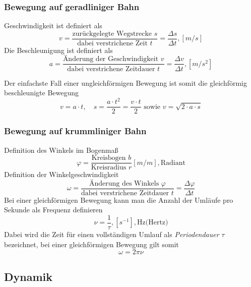 \documentclass[12pt,a4paper,ngerman]{article}
\begin{document}
\subsubsection*{Bewegung auf geradliniger Bahn}
Geschwindigkeit ist definiert als
\begin{equation}
v = \frac{\text{zurückgelegte Wegstrecke } s}{\text{dabei verstrichene  Zeit }  t} = 
\frac{\Delta s}{\Delta t}, [m/s]
\end{equation}
Die Beschleunigung ist definiert als
\begin{equation}
a = \frac{\text{Änderung der Geschwindigkeit }v}{\text{dabei verstrichene Zeitdauer }t} = \frac{\Delta v}{\Delta t}, [m/s^2]
\end{equation}

Der einfachste Fall einer ungleichförmigen Bewegung ist somit die gleichförmig beschleunigte Bewegung
\begin{equation}
v = a \cdot t , \quad s = \frac{a\cdot t^2}{2} = \frac{v\cdot t}{2} \text{ sowie } v = \sqrt{2\cdot a \cdot s}
\end{equation}
\subsubsection*{Bewegung auf krummliniger Bahn}
Definition des Winkels im Bogenmaß
\begin{equation}
\varphi = \frac{\text{Kreisbogen }b}{\text{Kreisradius }r} [m/m], \text{Radiant}
\end{equation}
Definition der Winkelgeschwindigkeit
\begin{equation}
\omega= \frac{\text{Änderung des Winkels }\varphi}{\text{dabei verstrichene Zeitdauer }t} = \frac{\Delta \varphi}{\Delta t}
\end{equation}
Bei einer gleichförmigen Bewegung kann man die Anzahl der Umläufe pro Sekunde als Frequenz definieren
\begin{equation}
\nu = \frac{1}{\tau}, [s^{-1}], \text{Hz(Hertz)}
\end{equation}
Dabei wird die Zeit für einen vollständigen Umlauf als \textit{Periodendauer} $\tau$ bezeichnet, bei einer gleichförmigen Bewegung gilt somit
\begin{equation}
\omega = 2 \pi \nu
\end{equation}

\subsection{Dynamik}
\end{document}
